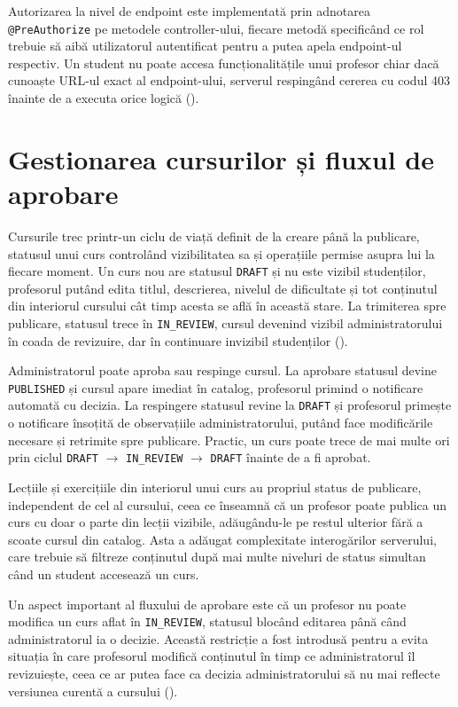 Autorizarea la nivel de endpoint este implementată prin adnotarea \texttt{@PreAuthorize} pe metodele controller-ului, fiecare metodă specificând ce rol trebuie să aibă utilizatorul autentificat pentru a putea apela endpoint-ul respectiv. Un student nu poate accesa funcționalitățile unui profesor chiar dacă cunoaște URL-ul exact al endpoint-ului, serverul respingând cererea cu codul 403 înainte de a executa orice logică ().

\section{Gestionarea cursurilor și fluxul de aprobare}
Cursurile trec printr-un ciclu de viață definit de la creare până la publicare, statusul unui curs controlând vizibilitatea sa și operațiile permise asupra lui la fiecare moment. Un curs nou are statusul \texttt{DRAFT} și nu este vizibil studenților, profesorul putând edita titlul, descrierea, nivelul de dificultate și tot conținutul din interiorul cursului cât timp acesta se află în această stare. La trimiterea spre publicare, statusul trece în \texttt{IN\_REVIEW}, cursul devenind vizibil administratorului în coada de revizuire, dar în continuare invizibil studenților ().

Administratorul poate aproba sau respinge cursul. La aprobare statusul devine \texttt{PUBLISHED} și cursul apare imediat în catalog, profesorul primind o notificare automată cu decizia. La respingere statusul revine la \texttt{DRAFT} și profesorul primește o notificare însoțită de observațiile administratorului, putând face modificările necesare și retrimite spre publicare. Practic, un curs poate trece de mai multe ori prin ciclul \texttt{DRAFT} $\rightarrow$ \texttt{IN\_REVIEW} $\rightarrow$ \texttt{DRAFT} înainte de a fi aprobat.

Lecțiile și exercițiile din interiorul unui curs au propriul status de publicare, independent de cel al cursului, ceea ce înseamnă că un profesor poate publica un curs cu doar o parte din lecții vizibile, adăugându-le pe restul ulterior fără a scoate cursul din catalog. Asta a adăugat complexitate interogărilor serverului, care trebuie să filtreze conținutul după mai multe niveluri de status simultan când un student accesează un curs.

Un aspect important al fluxului de aprobare este că un profesor nu poate modifica un curs aflat în \texttt{IN\_REVIEW}, statusul blocând editarea până când administratorul ia o decizie. Această restricție a fost introdusă pentru a evita situația în care profesorul modifică conținutul în timp ce administratorul îl revizuiește, ceea ce ar putea face ca decizia administratorului să nu mai reflecte versiunea curentă a cursului ().


